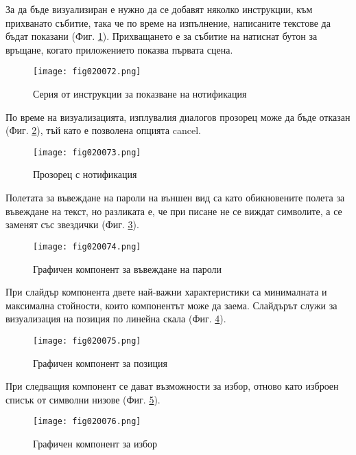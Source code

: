 За да бъде визуализиран е нужно да се добавят няколко инструкции, към прихванато събитие, така че по време на изпълнение, написаните текстове да бъдат показани (Фиг. \ref{fig020072}). Прихващането е за събитие на натиснат бутон за връщане, когато приложението показва първата сцена. 

\begin{figure}[H]
  \centering
  \texttt{[image: fig020072.png]}
  \caption{Серия от инструкции за показване на нотификация}
\label{fig020072}
\end{figure}

По време на визуализацията, изплувалия диалогов прозорец може да бъде отказан (Фиг. \ref{fig020073}), тъй като е позволена опцията cancel.

\begin{figure}[H]
  \centering
  \texttt{[image: fig020073.png]}
  \caption{Прозорец с нотификация}
\label{fig020073}
\end{figure}

Полетата за въвеждане на пароли на външен вид са като обикновените полета за въвеждане на текст, но разликата е, че при писане не се виждат символите, а се заменят със звездички (Фиг. \ref{fig020074}).

\begin{figure}[H]
  \centering
  \texttt{[image: fig020074.png]}
  \caption{Графичен компонент за въвеждане на пароли}
\label{fig020074}
\end{figure}

При слайдър компонента двете най-важни характеристики са минималната и максимална стойности, които компонентът може да заема. Слайдърът служи за визуализация на позиция по линейна скала (Фиг. \ref{fig020075}).

\begin{figure}[H]
  \centering
  \texttt{[image: fig020075.png]}
  \caption{Графичен компонент за позиция}
\label{fig020075}
\end{figure}

При следващия компонент се дават възможности за избор, отново като изброен списък от символни низове (Фиг. \ref{fig020076}).

\begin{figure}[H]
  \centering
  \texttt{[image: fig020076.png]}
  \caption{Графичен компонент за избор}
\label{fig020076}
\end{figure}

